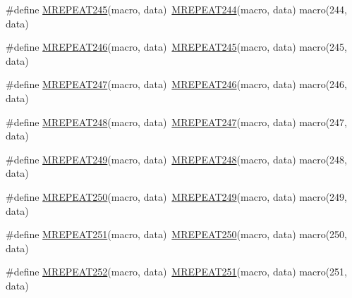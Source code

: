 \begin{DoxyCompactItemize}
\item 
\#define \mbox{\hyperlink{group__group__sam0__utils__mrepeat_gaef88abd24a21c1424bcef16151f33acc}{M\+R\+E\+P\+E\+A\+T245}}(macro,  data)~\mbox{\hyperlink{group__group__sam0__utils__mrepeat_ga96b96568f137828bd94f1df72f9ea533}{M\+R\+E\+P\+E\+A\+T244}}(macro, data)   macro(244, data)
\item 
\#define \mbox{\hyperlink{group__group__sam0__utils__mrepeat_ga648b2d33e6ae37d7f576055603bcb620}{M\+R\+E\+P\+E\+A\+T246}}(macro,  data)~\mbox{\hyperlink{group__group__sam0__utils__mrepeat_gaef88abd24a21c1424bcef16151f33acc}{M\+R\+E\+P\+E\+A\+T245}}(macro, data)   macro(245, data)
\item 
\#define \mbox{\hyperlink{group__group__sam0__utils__mrepeat_ga93c99f19dd27b6ad1c3921e4f473f50d}{M\+R\+E\+P\+E\+A\+T247}}(macro,  data)~\mbox{\hyperlink{group__group__sam0__utils__mrepeat_ga648b2d33e6ae37d7f576055603bcb620}{M\+R\+E\+P\+E\+A\+T246}}(macro, data)   macro(246, data)
\item 
\#define \mbox{\hyperlink{group__group__sam0__utils__mrepeat_ga0bee84ef9cc1bc4f81563c8fc476fed4}{M\+R\+E\+P\+E\+A\+T248}}(macro,  data)~\mbox{\hyperlink{group__group__sam0__utils__mrepeat_ga93c99f19dd27b6ad1c3921e4f473f50d}{M\+R\+E\+P\+E\+A\+T247}}(macro, data)   macro(247, data)
\item 
\#define \mbox{\hyperlink{group__group__sam0__utils__mrepeat_ga09e41b2792e87e2db97093c344127c3d}{M\+R\+E\+P\+E\+A\+T249}}(macro,  data)~\mbox{\hyperlink{group__group__sam0__utils__mrepeat_ga0bee84ef9cc1bc4f81563c8fc476fed4}{M\+R\+E\+P\+E\+A\+T248}}(macro, data)   macro(248, data)
\item 
\#define \mbox{\hyperlink{group__group__sam0__utils__mrepeat_ga35656197f887f34430287ec13dc48193}{M\+R\+E\+P\+E\+A\+T250}}(macro,  data)~\mbox{\hyperlink{group__group__sam0__utils__mrepeat_ga09e41b2792e87e2db97093c344127c3d}{M\+R\+E\+P\+E\+A\+T249}}(macro, data)   macro(249, data)
\item 
\#define \mbox{\hyperlink{group__group__sam0__utils__mrepeat_ga1b24f68c1e46baf224a8d05207d768f4}{M\+R\+E\+P\+E\+A\+T251}}(macro,  data)~\mbox{\hyperlink{group__group__sam0__utils__mrepeat_ga35656197f887f34430287ec13dc48193}{M\+R\+E\+P\+E\+A\+T250}}(macro, data)   macro(250, data)
\item 
\#define \mbox{\hyperlink{group__group__sam0__utils__mrepeat_ga83ac32e68c09ace0114ad0af4f39b7df}{M\+R\+E\+P\+E\+A\+T252}}(macro,  data)~\mbox{\hyperlink{group__group__sam0__utils__mrepeat_ga1b24f68c1e46baf224a8d05207d768f4}{M\+R\+E\+P\+E\+A\+T251}}(macro, data)   macro(251, data)

\end{DoxyCompactItemize}
